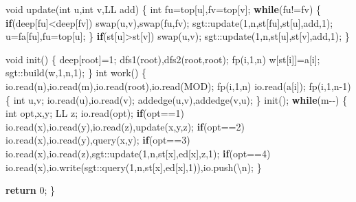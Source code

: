 \documentclass[
]{article}
\newenvironment{Shaded}{}{}
\newcommand{\CharTok}[1]{\textcolor[rgb]{0.25,0.44,0.63}{#1}}
\newcommand{\ControlFlowTok}[1]{\textcolor[rgb]{0.00,0.44,0.13}{\textbf{#1}}}
\newcommand{\DataTypeTok}[1]{\textcolor[rgb]{0.56,0.13,0.00}{#1}}
\newcommand{\DecValTok}[1]{\textcolor[rgb]{0.25,0.63,0.44}{#1}}
\newcommand{\NormalTok}[1]{#1}
\newcommand{\SpecialCharTok}[1]{\textcolor[rgb]{0.25,0.44,0.63}{#1}}
\begin{document}
\begin{Shaded}
\begin{Highlighting}[]
\DataTypeTok{void}\NormalTok{ update(}\DataTypeTok{int}\NormalTok{ u,}\DataTypeTok{int}\NormalTok{ v,LL add)}
\NormalTok{\{}
    \DataTypeTok{int}\NormalTok{ fu=top[u],fv=top[v];}
    \ControlFlowTok{while}\NormalTok{(fu!=fv)}
\NormalTok{    \{}
        \ControlFlowTok{if}\NormalTok{(deep[fu]\textless{}deep[fv])}
\NormalTok{            swap(u,v),swap(fu,fv);}
\NormalTok{        sgt::update(}\DecValTok{1}\NormalTok{,n,st[fu],st[u],add,}\DecValTok{1}\NormalTok{);}
\NormalTok{        u=fa[fu],fu=top[u];}
\NormalTok{    \}}
    \ControlFlowTok{if}\NormalTok{(st[u]\textgreater{}st[v]) swap(u,v);}
\NormalTok{    sgt::update(}\DecValTok{1}\NormalTok{,n,st[u],st[v],add,}\DecValTok{1}\NormalTok{);}
\NormalTok{\}}

\DataTypeTok{void}\NormalTok{ init()}
\NormalTok{\{}
\NormalTok{    deep[root]=}\DecValTok{1}\NormalTok{;}
\NormalTok{    dfs1(root),dfs2(root,root);}
\NormalTok{    fp(i,}\DecValTok{1}\NormalTok{,n) w[st[i]]=a[i];}
\NormalTok{    sgt::build(w,}\DecValTok{1}\NormalTok{,n,}\DecValTok{1}\NormalTok{);}
\NormalTok{\}}
\DataTypeTok{int}\NormalTok{ work()}
\NormalTok{\{}
\NormalTok{    io.read(n),io.read(m),io.read(root),io.read(MOD);}
\NormalTok{    fp(i,}\DecValTok{1}\NormalTok{,n) io.read(a[i]);}
\NormalTok{    fp(i,}\DecValTok{1}\NormalTok{,n{-}}\DecValTok{1}\NormalTok{)}
\NormalTok{    \{}
        \DataTypeTok{int}\NormalTok{ u,v;}
\NormalTok{        io.read(u),io.read(v);}
\NormalTok{        addedge(u,v),addedge(v,u);}
\NormalTok{    \}}
\NormalTok{    init();}
    \ControlFlowTok{while}\NormalTok{(m{-}{-})}
\NormalTok{    \{}
        \DataTypeTok{int}\NormalTok{ opt,x,y; LL z;}
\NormalTok{        io.read(opt);}
        \ControlFlowTok{if}\NormalTok{(opt==}\DecValTok{1}\NormalTok{) io.read(x),io.read(y),io.read(z),update(x,y,z);}
        \ControlFlowTok{if}\NormalTok{(opt==}\DecValTok{2}\NormalTok{) io.read(x),io.read(y),query(x,y);}
        \ControlFlowTok{if}\NormalTok{(opt==}\DecValTok{3}\NormalTok{) io.read(x),io.read(z),sgt::update(}\DecValTok{1}\NormalTok{,n,st[x],ed[x],z,}\DecValTok{1}\NormalTok{);}
        \ControlFlowTok{if}\NormalTok{(opt==}\DecValTok{4}\NormalTok{) io.read(x),io.write(sgt::query(}\DecValTok{1}\NormalTok{,n,st[x],ed[x],}\DecValTok{1}\NormalTok{)),io.push(}\CharTok{\textquotesingle{}}\SpecialCharTok{\textbackslash{}n}\CharTok{\textquotesingle{}}\NormalTok{);}
\NormalTok{    \}}

    \ControlFlowTok{return} \DecValTok{0}\NormalTok{;}
\NormalTok{\}}
\end{Highlighting}
\end{Shaded}
\end{document}

